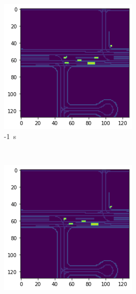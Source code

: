 \documentclass[12pt]{article}
\begin{document}
        \begin{figure}[H]
            \centering
            \begin{subfigure}[b]{0.18\textwidth}
                \includegraphics[width=\textwidth]{output_low_dens_0.png}
                \caption{-1~s}
            \end{subfigure}
            ~
            \begin{subfigure}[b]{0.18\textwidth}
                \includegraphics[width=\textwidth]{output_low_dens_1.png}

\end{subfigure}
\end{figure}
\end{document}
